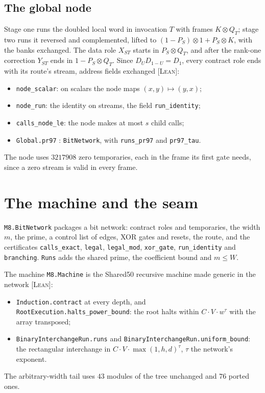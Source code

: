 \documentclass[11pt]{amsart}
\theoremstyle{remark}
\newcommand{\lean}[1]{\texttt{#1}}
\newcommand{\tagL}{\textsc{[Lean]}}
\begin{document}
\subsection{The global node}
Stage one runs the doubled local word in invocation $T$ with frames $K \otimes Q_T$; stage two
runs it reversed and complemented, lifted to $(1 - P_S) \otimes 1 + P_S \otimes K$, with the banks
exchanged. The data role $X_{ST}$ starts in $P_S \otimes Q_T$, and after the rank-one correction
$Y_{ST}$ ends in $1 - P_S \otimes Q_T$. Since $D_U D_{1-U} = D_1$, every contract role ends with
its route's stream, address fields exchanged \tagL:
\begin{itemize}
\item \lean{node\_scalar}: on scalars the node maps $(x, y) \mapsto (y, x)$;
\item \lean{node\_run}: the identity on streams, the field \lean{run\_identity};
\item \lean{calls\_node\_le}: the node makes at most $s$ child calls;
\item \lean{Global.pr97} : \lean{BitNetwork}, with \lean{runs\_pr97} and \lean{pr97\_tau}.
\end{itemize}
The node uses $3217908$ zero temporaries, each in the frame its first gate needs, since a zero
stream is valid in every frame.

\section{The machine and the seam}\label{sec:machine}

\lean{M8.BitNetwork} packages a bit network: contract roles and temporaries, the width $m$, the
prime, a control list of edges, XOR gates and resets, the route, and the certificates
\lean{calls\_exact}, \lean{legal}, \lean{legal\_mod}, \lean{xor\_gate}, \lean{run\_identity} and
\lean{branching}. \lean{Runs} adds the shared prime, the coefficient bound and $m \le W$.

The machine \lean{M8.Machine} is the Shared50 recursive machine made generic in the network
\tagL:
\begin{itemize}
\item \lean{Induction.contract} at every depth, and \lean{RootExecution.halts\_power\_bound}: the
  root halts within $C \cdot V \cdot w^{\tau}$ with the array transposed;
\item \lean{BinaryInterchangeRun.runs} and \lean{BinaryInterchangeRun.uniform\_bound}: the
  rectangular interchange in $C \cdot V \cdot \max(1, h, d)^{\tau}$, $\tau$ the network's
  exponent.
\end{itemize}
The arbitrary-width tail uses $43$ modules of the tree unchanged and $76$ ported ones.
\end{document}
